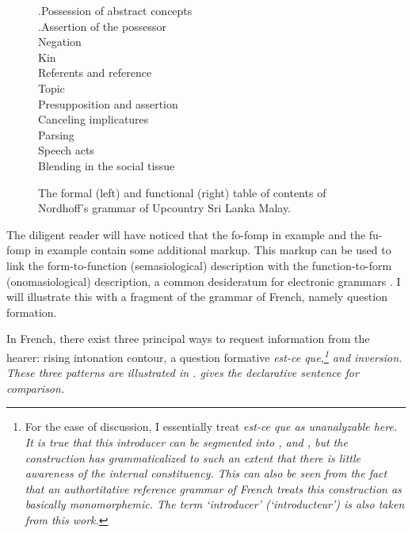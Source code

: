 \documentclass[a4paper,12pt]{article}
\begin{document}
\begin{figure}
{.\hspace{.5cm}Possession of abstract concepts \\
.\hspace{.5cm}Assertion of the possessor \\
Negation\\
Kin\\
Referents and reference\\
Topic\\
Presupposition and assertion\\
Canceling implicatures\\
Parsing\\
Speech acts\\
Blending in the social tissue\\
}
\caption{The formal (left) and functional (right) table of contents of Nordhoff's grammar of Upcountry Sri Lanka Malay.}
\label{fig:nordhoff}
\end{figure}
 


 





The diligent reader will have noticed that the fo-fomp in example  and the fu-fomp in example  contain some additional markup. This markup can be used to link the form-to-function (semasiological) description with the function-to-form (onomasiological) description, a common desideratum for electronic grammars \citep{Comrie1998,Lehmann1998,Zaefferer1998,Mosel2006craft,Nordhoff2008jldc}. I will illustrate this with a fragment of the grammar of French, namely question formation.

In French, there exist three principal ways to request information from the hearer:  rising intonation contour, a question formative \em est-ce que\em,\footnote{For the ease of discussion, I essentially treat \em est-ce que \em as unanalyzable here. It is true that this introducer can be segmented into ,  and , but the construction has grammaticalized to such an extent that there is little awareness of the internal constituency. This can also be seen from the fact that an authortitative reference grammar of French \citep{GrevisseEtAl1995} treats this construction as basically monomorphemic. The term `introducer' (`introducteur') is also taken from this work.} and inversion. These three patterns are illustrated in .  gives the declarative sentence for comparison.
\end{document}
